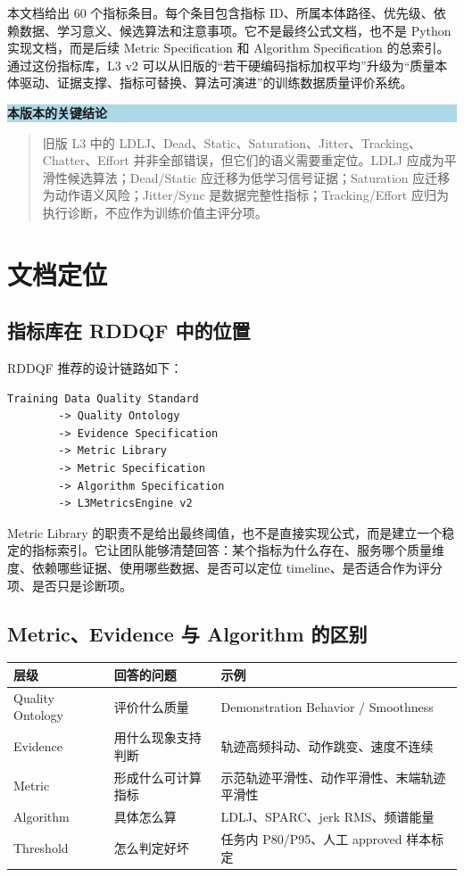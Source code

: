\documentclass[UTF8,zihao=-4]{ctexart}
\newenvironment{notebox}[1]{\vspace{0.5em}\noindent\colorbox{LightBlue}{\parbox{0.96\linewidth}{\textbf{#1}}}\par\vspace{-0.2em}\begin{quote}\small}{\end{quote}\vspace{0.3em}}
\begin{document}
本文档给出 60 个指标条目。每个条目包含指标 ID、所属本体路径、优先级、依赖数据、学习意义、候选算法和注意事项。它不是最终公式文档，也不是 Python 实现文档，而是后续 Metric Specification 和 Algorithm Specification 的总索引。通过这份指标库，L3 v2 可以从旧版的“若干硬编码指标加权平均”升级为“质量本体驱动、证据支撑、指标可替换、算法可演进”的训练数据质量评价系统。

\begin{notebox}{本版本的关键结论}
旧版 L3 中的 LDLJ、Dead、Static、Saturation、Jitter、Tracking、Chatter、Effort 并非全部错误，但它们的语义需要重定位。LDLJ 应成为平滑性候选算法；Dead/Static 应迁移为低学习信号证据；Saturation 应迁移为动作语义风险；Jitter/Sync 是数据完整性指标；Tracking/Effort 应归为执行诊断，不应作为训练价值主评分项。
\end{notebox}

\section{文档定位}

\subsection{指标库在 RDDQF 中的位置}

RDDQF 推荐的设计链路如下：

\begin{verbatim}
Training Data Quality Standard
        -> Quality Ontology
        -> Evidence Specification
        -> Metric Library
        -> Metric Specification
        -> Algorithm Specification
        -> L3MetricsEngine v2
\end{verbatim}

Metric Library 的职责不是给出最终阈值，也不是直接实现公式，而是建立一个稳定的指标索引。它让团队能够清楚回答：某个指标为什么存在、服务哪个质量维度、依赖哪些证据、使用哪些数据、是否可以定位 timeline、是否适合作为评分项、是否只是诊断项。

\subsection{Metric、Evidence 与 Algorithm 的区别}

\begin{longtable}{L{3.2cm} L{4.0cm} L{6.8cm}}
\toprule
层级 & 回答的问题 & 示例 \\
\midrule
Quality Ontology & 评价什么质量 & Demonstration Behavior / Smoothness \\
Evidence & 用什么现象支持判断 & 轨迹高频抖动、动作跳变、速度不连续 \\
Metric & 形成什么可计算指标 & 示范轨迹平滑性、动作平滑性、末端轨迹平滑性 \\
Algorithm & 具体怎么算 & LDLJ、SPARC、jerk RMS、频谱能量 \\
Threshold & 怎么判定好坏 & 任务内 P80/P95、人工 approved 样本标定 \\
\bottomrule
\end{longtable}
\end{document}
